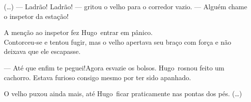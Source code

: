 \documentclass[12pt]{memoir}
\begin{document}

\title {\textbf{}}
\author {\textit{}}
\date{}
\maketitle
\newpage

\newcommand{\omenino}{Hugo}

\LARGE (\ldots) --- Ladrão! Ladrão! --- gritou o velho para o corredor vazio. --- Alguém chame o inspetor da estação! 

A menção ao inspetor fez \omenino\ entrar em pânico.\\ Contorceu-se e tentou fugir, mas o velho apertava seu braço com força e não deixava que ele escapasse. 

--- Até que enfim te peguei!Agora esvazie os bolsos. \omenino\ rosnou feito um cachorro. Estava furioso consigo mesmo por ter sido apanhado. 

O velho puxou ainda mais, até \omenino\ ficar praticamente nas pontas dos pés. (\ldots) 
\end{document}
